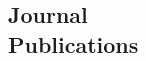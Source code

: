 \documentclass[margin,line]{resume}
\begin{document}
\begin{resume}
\section{\mysidestyle Journal\\Publications}
      \begin{bibenum}
        \item {}
      \end{bibenum}



\end{resume}
\end{document}
